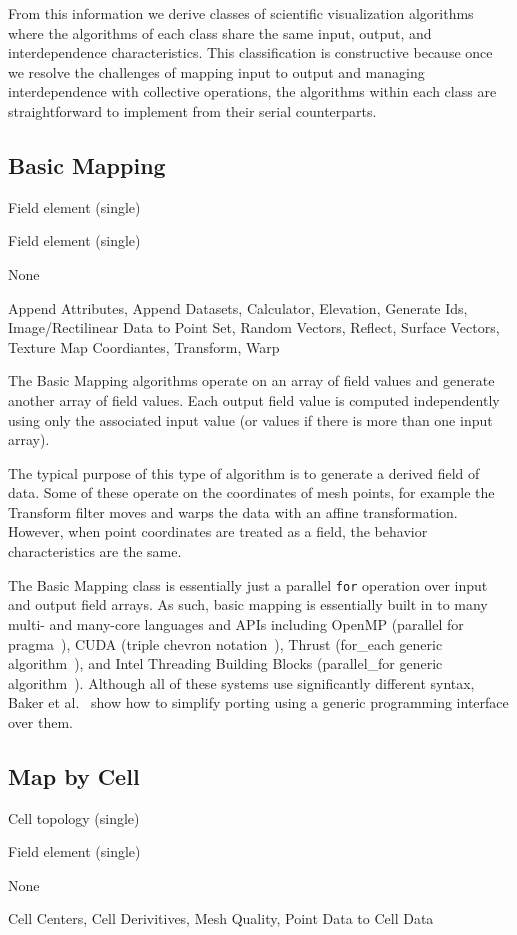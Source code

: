 \documentclass{sig-alternate}
\newcommand*{\lcite}[1]{~\cite{#1}}
\newcommand*{\scite}[1]{~\cite{#1}}
\newcommand{\etal}{et al.}
\newcommand{\algclass}[1]{\textsf{#1}}
\newcommand{\alg}[1]{#1}
\newcommand{\algorithmclasssection}[1]{\subsection*{#1}}
\newcommand{\algorithmclass}[5]{
  \algorithmclasssection{#1} %
  \begin{description}[leftmargin=9em,style=nextline,noitemsep]
    \raggedright
  \item[Input] #2
  \item[Output] #3
  \item[Interdependence] #4
  \item[Algorithms] #5
  \end{description}
}
\begin{document}
From this information we derive classes of scientific visualization
algorithms where the algorithms of each class share the same input,
output, and interdependence characteristics. This classification is
constructive because once we resolve the challenges of mapping input to
output and managing interdependence with collective operations, the
algorithms within each class are straightforward to implement from their
serial counterparts.

\algorithmclass{Basic Mapping}
               {Field element (single)} %
               {Field element (single)} %
               {None} %
               {
                 Append Attributes,
                 Append Datasets,
                 Calculator,
                 Elevation,
                 Generate Ids,
                 Image/Rectilinear Data to Point Set,
                 Random Vectors,
                 Reflect,
                 Surface Vectors,
                 Texture Map Coordiantes,
                 Transform,
                 Warp}

\noindent
The \algclass{Basic Mapping} algorithms operate on an array of field values
and generate another array of field values. Each output field value is
computed independently using only the associated input value (or values if
there is more than one input array).

The typical purpose of this type of algorithm is to generate a derived
field of data. Some of these operate on the coordinates of mesh points, for
example the \alg{Transform} filter moves and warps the data with an affine
transformation. However, when point coordinates are treated as a field, the
behavior characteristics are the same.

The \algclass{Basic Mapping} class is essentially just a parallel
\texttt{for} operation over input and output field arrays. As such, basic
mapping is essentially built in to many multi- and many-core languages and
APIs including OpenMP (parallel for pragma\lcite{Quinn2004}), CUDA (triple
chevron notation\lcite{Sanders2011}), Thrust (for\_each generic
algorithm\lcite{Thrust}), and Intel Threading Building Blocks
(parallel\_for generic algorithm\lcite{TBB}). Although all of these systems
use significantly different syntax, Baker \etal\scite{Baker2010} show how
to simplify porting using a generic programming interface over them.


\algorithmclass{Map by Cell}
               {Cell topology (single)} %
               {Field element (single)} %
               {None} %
               {
                 Cell Centers,
                 Cell Derivitives,
                 Mesh Quality,
                 Point Data to Cell Data
               }
\end{document}
